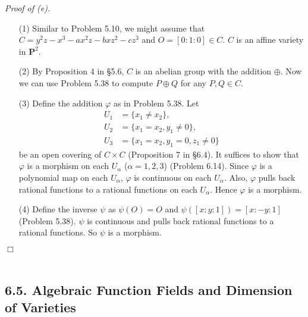 \documentclass{article}
\begin{document}
\emph{Proof of (e).}
\begin{enumerate}
\item[(1)]
  Similar to Problem 5.10,
  we might assume that $C = y^2z - x^3 - ax^2z - bxz^2 - cz^3$ and $O = [0:1:0] \in C$.
  $C$ is an affine variety in $\mathbf{P}^2$.

\item[(2)]
  By Proposition 4 in \S 5.6,
  $C$ is an abelian group with the addition $\oplus$.
  Now we can use Problem 5.38 to compute $P \oplus Q$ for any $P, Q \in C$.

\item[(3)]
  Define the addition $\varphi$ as in Problem 5.38.
  Let 
  \begin{align*}
    U_1 &= \{ x_1 \neq x_2 \}, \\
    U_2 &= \{ x_1 = x_2, y_1 \neq 0 \}, \\
    U_3 &= \{ x_1 = x_2, y_1 = 0, z_1 \neq 0 \}
  \end{align*}
  be an open covering of $C \times C$ (Proposition 7 in \S 6.4).
  It suffices to show that $\varphi$ is a morphism on each $U_\alpha$ ($\alpha = 1, 2, 3$)
  (Problem 6.14).
  Since $\varphi$ is a polynomial map on each $U_\alpha$,
  $\varphi$ is continuous on each $U_\alpha$.
  Also, $\varphi$ pulls back rational functions to a rational functions on each $U_\alpha$.
  Hence $\varphi$ is a morphism.

\item[(4)]
  Define the inverse $\psi$ as $\psi(O) = O$ and $\psi([x:y:1]) = [x:-y:1]$ (Problem 5.38).
  $\psi$ is continuous
  and pulls back rational functions to a rational functions.
  So $\psi$ is a morphism.
\end{enumerate}
$\Box$ \\\\






\subsection*{6.5. Algebraic Function Fields and Dimension of Varieties \\}
\end{document}
